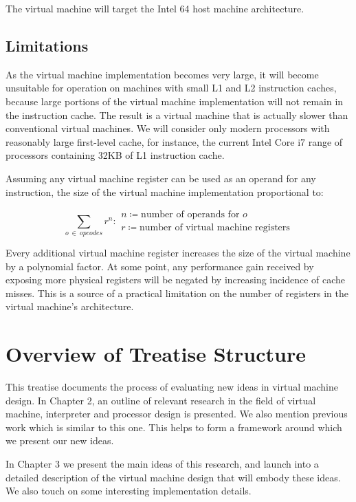 		The virtual machine will target the Intel 64 host machine architecture.
		
		\subsection{Limitations}
			As the virtual machine implementation becomes very large, it will become unsuitable for operation on machines with small L1 and L2 instruction caches, because large portions of the virtual machine implementation will not remain in the instruction cache. The result is a virtual machine that is actually slower than conventional virtual machines. We will consider only modern processors with reasonably large first-level cache, for instance, the current Intel Core i7 range of processors containing 32KB of L1 instruction cache.
			
			Assuming any virtual machine register can be used as an operand for any instruction, the size of the virtual machine implementation proportional to:
			
			\[
				\sum_{o~\in~opcodes} r^n : 
					\begin{array}{l}
						n \coloneqq \text{number of operands for $o$} \\
						r \coloneqq \text{number of virtual machine registers}
					\end{array}
			\] 
			
			Every additional virtual machine register increases the size of the virtual machine by a polynomial factor. At some point, any performance gain received by exposing more physical registers will be negated by increasing incidence of cache misses. This is a source of a practical limitation on the number of registers in the virtual machine's architecture.
				
	\section{Overview of Treatise Structure}
		This treatise documents the process of evaluating new ideas in virtual machine design. In Chapter 2, an outline of relevant research in the field of virtual machine, interpreter and processor design is presented. We also mention previous work which is similar to this one. This helps to form a framework around which we present our new ideas.
		
		In Chapter 3 we present the main ideas of this research, and launch into a detailed description of the virtual machine design that will embody these ideas. We also touch on some interesting implementation details.
		
